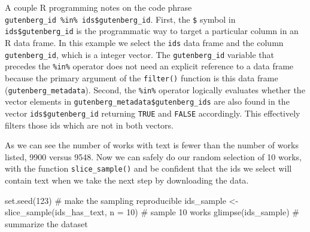 \documentclass[
  letterpaper,
]{latex/krantz}
\newenvironment{Shaded}{\begin{snugshade}}{\end{snugshade}}
\newcommand{\AttributeTok}[1]{\textcolor[rgb]{0.40,0.45,0.13}{#1}}
\newcommand{\CommentTok}[1]{\textcolor[rgb]{0.37,0.37,0.37}{#1}}
\newcommand{\DecValTok}[1]{\textcolor[rgb]{0.68,0.00,0.00}{#1}}
\newcommand{\FunctionTok}[1]{\textcolor[rgb]{0.28,0.35,0.67}{#1}}
\newcommand{\NormalTok}[1]{\textcolor[rgb]{0.00,0.23,0.31}{#1}}
\newcommand{\OtherTok}[1]{\textcolor[rgb]{0.00,0.23,0.31}{#1}}
\begin{document}
\begin{tcolorbox}[enhanced jigsaw, toprule=.15mm, bottomtitle=1mm, coltitle=black, title=\textcolor{quarto-callout-warning-color}{\faExclamationTriangle}\hspace{0.5em}{Tip}, left=2mm, colframe=quarto-callout-warning-color-frame, bottomrule=.15mm, colbacktitle=quarto-callout-warning-color!10!white, leftrule=.75mm, colback=white, titlerule=0mm, breakable, toptitle=1mm, opacityback=0, arc=.35mm, rightrule=.15mm, opacitybacktitle=0.6]

A couple R programming notes on the code phrase
\texttt{gutenberg\_id\ \%in\%\ ids\$gutenberg\_id}. First, the
\texttt{\$} symbol in \texttt{ids\$gutenberg\_id} is the programmatic
way to target a particular column in an R data frame. In this example we
select the \texttt{ids} data frame and the column
\texttt{gutenberg\_id}, which is a integer vector. The
\texttt{gutenberg\_id} variable that precedes the \texttt{\%in\%}
operator does not need an explicit reference to a data frame because the
primary argument of the \texttt{filter()} function is this data frame
(\texttt{gutenberg\_metadata}). Second, the \texttt{\%in\%} operator
logically evaluates whether the vector elements in
\texttt{gutenberg\_metadata\$gutenberg\_ids} are also found in the
vector \texttt{ids\$gutenberg\_id} returning \texttt{TRUE} and
\texttt{FALSE} accordingly. This effectively filters those ids which are
not in both vectors.

\end{tcolorbox}

As we can see the number of works with text is fewer than the number of
works listed, 9900 versus 9548. Now we can safely do our random
selection of 10 works, with the function \texttt{slice\_sample()} and be
confident that the ids we select will contain text when we take the next
step by downloading the data.

\begin{Shaded}
\begin{Highlighting}[]
\FunctionTok{set.seed}\NormalTok{(}\DecValTok{123}\NormalTok{) }\CommentTok{\# make the sampling reproducible}
\NormalTok{ids\_sample }\OtherTok{\textless{}{-}} \FunctionTok{slice\_sample}\NormalTok{(ids\_has\_text, }\AttributeTok{n =} \DecValTok{10}\NormalTok{) }\CommentTok{\# sample 10 works}
\FunctionTok{glimpse}\NormalTok{(ids\_sample) }\CommentTok{\# summarize the dataset}
\end{Highlighting}
\end{Shaded}
\end{document}
